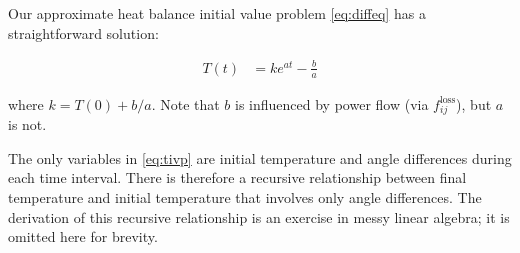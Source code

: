 \documentclass[journal,twoside]{IEEEtran}
\begin{document}
Our approximate heat balance initial value problem \eqref{eq:diffeq} has a straightforward solution:

\begin{align}\label{eq:tivp}
T(t) &= ke^{at} - \frac{b}{a}
\end{align}

where $k=T(0) + b/a$. Note that $b$ is influenced by power flow (via
$f_{ij}^\text{loss}$), but $a$ is not.

The only variables in \eqref{eq:tivp} are initial temperature and angle differences during each time interval. There is therefore a recursive relationship between final temperature and initial temperature that involves only angle differences. The derivation of this recursive relationship is an exercise in messy linear algebra; it is omitted here for brevity.
%
\end{document}
